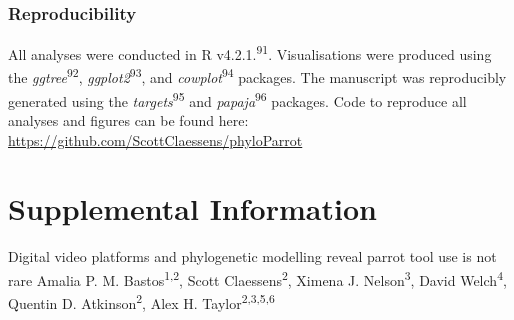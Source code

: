 \documentclass[
  man, donotrepeattitle,floatsintext]{apa6}
\begin{document}
\hypertarget{reproducibility}{%
\subsubsection{Reproducibility}\label{reproducibility}}

All analyses were conducted in R v4.2.1.\textsuperscript{91}. Visualisations were
produced using the \emph{ggtree}\textsuperscript{92}, \emph{ggplot2}\textsuperscript{93}, and \emph{cowplot}\textsuperscript{94} packages. The manuscript was reproducibly generated using the
\emph{targets}\textsuperscript{95} and \emph{papaja}\textsuperscript{96} packages. Code to reproduce all
analyses and figures can be found here:
\url{https://github.com/ScottClaessens/phyloParrot}

\newpage
\nolinenumbers
\vspace*{60mm}

\renewcommand{\figurename}{Figure}
\renewcommand{\tablename}{Table}
\renewcommand{\thefigure}{S\arabic{figure}} \setcounter{figure}{0}
\renewcommand{\thetable}{S\arabic{table}} \setcounter{table}{0}
\renewcommand{\theequation}{S\arabic{equation}} \setcounter{equation}{0}

\hypertarget{supplemental-information}{%
\section{\texorpdfstring{\textbf{Supplemental Information}}{Supplemental Information}}\label{supplemental-information}}

\setcounter{page}{1}
\centering

\noindent \hspace*{5mm} \small Digital video platforms and phylogenetic modelling reveal parrot tool use is not rare \newline
\hspace*{1cm} \small Amalia P. M. Bastos\textsuperscript{1,2}, Scott Claessens\textsuperscript{2}, Ximena J. Nelson\textsuperscript{3}, David Welch\textsuperscript{4}, \newline
\hspace*{25mm} Quentin D. Atkinson\textsuperscript{2}, Alex H. Taylor\textsuperscript{2,3,5,6} \newline

\raggedright
\end{document}
